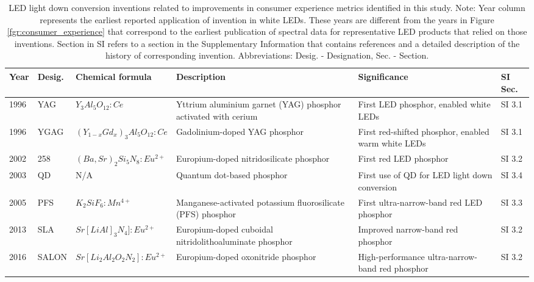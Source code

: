 \documentclass[twoside,twocolumn,9pt]{article}
\begin{document}
\begin{table}[h]
    \small
    \centering
    \begin{tabularx}{\textwidth}{|l|l|l|X|X|l|}
    \hline
        \textbf{Year} & \textbf{Desig.} & \textbf{Chemical formula} & \textbf{Description} & \textbf{Significance} & \textbf{SI Sec.} \\ \hline
        1996 & YAG & $Y_3 Al_5 O_{12}:Ce$ & Yttrium aluminium garnet (YAG) phosphor activated with cerium & First LED phosphor, enabled white LEDs & SI 3.1 \\ \hline
        1996 & YGAG & $(Y_{1-x} Gd_x)_3 Al_5 O_{12}:Ce$ & Gadolinium-doped YAG phosphor & First red-shifted phosphor, enabled warm white LEDs & SI 3.1 \\ \hline
        2002 & 258 & $(Ba,Sr)_2 Si_5 N_8:Eu^{2+}$ & Europium-doped nitridosilicate phosphor & First red LED phosphor & SI 3.2 \\ \hline
        2003 & QD & N/A & Quantum dot-based phosphor & First use of QD for LED light down conversion & SI 3.4 \\ \hline
        2005 & PFS & $K_2 SiF_6: Mn^{4+}$ & Manganese-activated potassium fluorosilicate (PFS) phosphor & First ultra-narrow-band red LED phosphor & SI 3.3 \\ \hline
        2013 & SLA & $Sr[Li Al]_3 N_4 ]:Eu^{2+}$ & Europium-doped cuboidal nitridolithoaluminate phosphor & Improved narrow-band red phosphor & SI 3.2 \\ \hline
        2016 & SALON & $Sr[Li_2 Al_2 O_2 N_2]:Eu^{2+}$ & Europium-doped oxonitride phosphor & High-performance ultra-narrow-band red phosphor & SI 3.2 \\ \hline
    \end{tabularx}
    \caption{LED light down conversion inventions related to improvements in consumer experience metrics identified in this study. Note: Year column represents the earliest reported application of invention in white LEDs. These years are different from the years in Figure \ref{fgr:consumer_experience} that correspond to the earliest publication of spectral data for representative LED products  that relied on those inventions. Section in SI refers to a section in the Supplementary Information that contains references and a detailed description of the history of corresponding invention. Abbreviations: Desig. - Designation, Sec. - Section.}
    \label{tab:phosphors}
\end{table}
\end{document}
